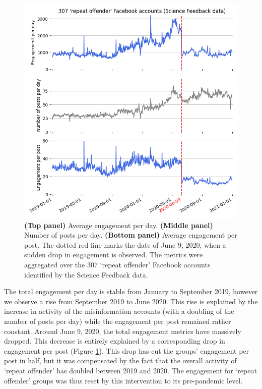 \documentclass[review]{elsarticle}
\begin{document}
\begin{figure}[!h]
\centering
\includegraphics[scale=0.5]{./../figure/sf_average_timeseries.png}
\caption{
{\bf(Top panel)} Average engagement per day. 
{\bf(Middle panel)} Number of posts per day. 
{\bf(Bottom panel)} Average engagement per post. 
The dotted red line marks the date of June 9, 2020, when a sudden drop in engagement is observed.
The metrics were aggregated over the 307 `repeat offender' Facebook accounts identified by the Science Feedback data.
}
\label{repeat_average_timeseries}
\end{figure}

The total engagement per day is stable from January to September 2019, however we observe a rise from September 2019 to June 2020. 
This rise is explained by the increase in activity of the misinformation accounts (with a doubling of the number of posts per day) while the engagement per post remained rather constant.
Around June 9, 2020, the total engagement metrics have massively dropped.
This decrease is entirely explained by a corresponding drop in engagement per post (Figure \ref{repeat_average_timeseries}).
This drop has cut the groups' engagement per post in half, but it was compensated by the fact that the overall activity of `repeat offender' has doubled between 2019 and 2020.
The engagement for `repeat offender' groups was thus reset by this intervention to its pre-pandemic level.
\end{document}
